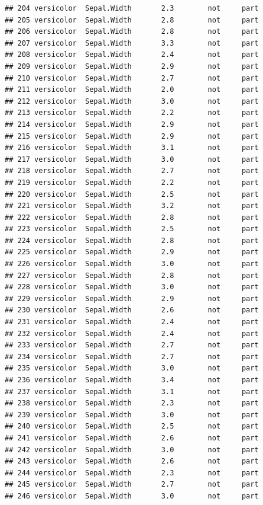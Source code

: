 \documentclass[krantz2]{krantz}\usepackage{knitr}%
\begin{document}
\begin{knitrout}
\begin{kframe}
\begin{verbatim}
## 204 versicolor  Sepal.Width       2.3        not     part
## 205 versicolor  Sepal.Width       2.8        not     part
## 206 versicolor  Sepal.Width       2.8        not     part
## 207 versicolor  Sepal.Width       3.3        not     part
## 208 versicolor  Sepal.Width       2.4        not     part
## 209 versicolor  Sepal.Width       2.9        not     part
## 210 versicolor  Sepal.Width       2.7        not     part
## 211 versicolor  Sepal.Width       2.0        not     part
## 212 versicolor  Sepal.Width       3.0        not     part
## 213 versicolor  Sepal.Width       2.2        not     part
## 214 versicolor  Sepal.Width       2.9        not     part
## 215 versicolor  Sepal.Width       2.9        not     part
## 216 versicolor  Sepal.Width       3.1        not     part
## 217 versicolor  Sepal.Width       3.0        not     part
## 218 versicolor  Sepal.Width       2.7        not     part
## 219 versicolor  Sepal.Width       2.2        not     part
## 220 versicolor  Sepal.Width       2.5        not     part
## 221 versicolor  Sepal.Width       3.2        not     part
## 222 versicolor  Sepal.Width       2.8        not     part
## 223 versicolor  Sepal.Width       2.5        not     part
## 224 versicolor  Sepal.Width       2.8        not     part
## 225 versicolor  Sepal.Width       2.9        not     part
## 226 versicolor  Sepal.Width       3.0        not     part
## 227 versicolor  Sepal.Width       2.8        not     part
## 228 versicolor  Sepal.Width       3.0        not     part
## 229 versicolor  Sepal.Width       2.9        not     part
## 230 versicolor  Sepal.Width       2.6        not     part
## 231 versicolor  Sepal.Width       2.4        not     part
## 232 versicolor  Sepal.Width       2.4        not     part
## 233 versicolor  Sepal.Width       2.7        not     part
## 234 versicolor  Sepal.Width       2.7        not     part
## 235 versicolor  Sepal.Width       3.0        not     part
## 236 versicolor  Sepal.Width       3.4        not     part
## 237 versicolor  Sepal.Width       3.1        not     part
## 238 versicolor  Sepal.Width       2.3        not     part
## 239 versicolor  Sepal.Width       3.0        not     part
## 240 versicolor  Sepal.Width       2.5        not     part
## 241 versicolor  Sepal.Width       2.6        not     part
## 242 versicolor  Sepal.Width       3.0        not     part
## 243 versicolor  Sepal.Width       2.6        not     part
## 244 versicolor  Sepal.Width       2.3        not     part
## 245 versicolor  Sepal.Width       2.7        not     part
## 246 versicolor  Sepal.Width       3.0        not     part

\end{verbatim}
\end{kframe}
\end{knitrout}
\end{document}

